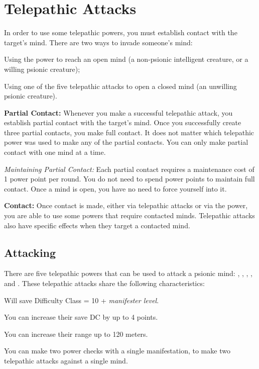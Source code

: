 \section{Telepathic Attacks}
In order to use some telepathic powers, you must establish contact with the target's mind. There are two ways to invade someone's mind:

\begin{itemize*}
	\item Using the  power to reach an open mind (a non-psionic intelligent creature, or a willing psionic creature);
	\item Using one of the five telepathic attacks to open a closed mind (an unwilling psionic creature).
\end{itemize*}

\textbf{Partial Contact:} Whenever you make a successful telepathic attack, you establish partial contact with the target's mind. Once you successfully create three partial contacts, you make full contact. It does not matter which telepathic power was used to make any of the partial contacts. You can only make partial contact with one mind at a time.

\textit{Maintaining Partial Contact:} Each partial contact requires a maintenance cost of 1 power point per round. You do not need to spend power points to maintain full contact. Once a mind is open, you have no need to force yourself into it.

\textbf{Contact:} Once contact is made, either via telepathic attacks or via the  power, you are able to use some powers that require contacted minds. Telepathic attacks also have specific effects when they target a contacted mind.

\subsection{Attacking}
There are five telepathic powers that can be used to attack a psionic mind: , , , , and . These telepathic attacks share the following characteristics:

\begin{itemize*}
	\item Will save Difficulty Class = 10 + \textit{manifester level}.
	\item You can increase their save DC by up to 4 points.
	\item You can increase their range up to 120 meters.
	\item You can make two power checks with a single manifestation, to make two telepathic attacks against a single mind.
\end{itemize*}

